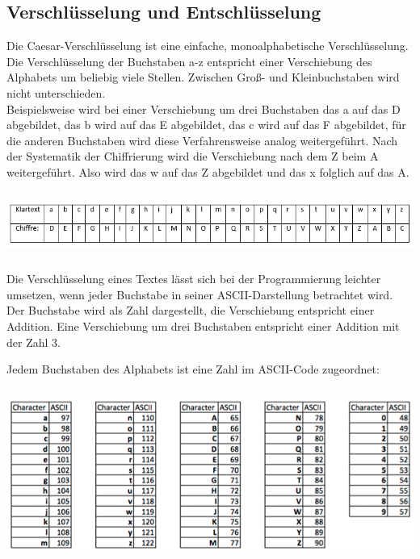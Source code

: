 \documentclass[ngerman,12pt]{article}
\begin{document}
\subsection*{Verschlüsselung und Entschlüsselung}
Die Caesar-Verschlüsselung ist eine einfache, monoalphabetische Verschlüsselung. Die Verschlüsselung der Buchstaben a-z entspricht einer Verschiebung des Alphabets um beliebig viele Stellen. Zwischen Groß- und Kleinbuchstaben wird nicht unterschieden.\\
Beispielsweise wird bei einer Verschiebung um drei Buchstaben das a auf das D abgebildet, das b wird auf das E abgebildet, das c wird auf das F abgebildet, für die anderen Buchstaben wird diese Verfahrensweise analog weitergeführt. Nach der Systematik der Chiffrierung wird die Verschiebung nach dem Z beim A weitergeführt. Also wird das w auf das Z abgebildet und das x folglich auf das A.

\begin{center}
\includegraphics[width=520pt,height=60pt]{Beispiel c=3.png}
\end{center}

Die Verschlüsselung eines Textes lässt sich bei der Programmierung leichter umsetzen, wenn jeder Buchstabe in seiner ASCII-Darstellung betrachtet wird. Der Buchstabe wird als Zahl dargestellt, die Verschiebung entspricht einer Addition. Eine Verschiebung um drei Buchstaben entspricht einer Addition mit der Zahl 3.

\newpage

Jedem Buchstaben des Alphabets ist eine Zahl im ASCII-Code zugeordnet:

\begin{center}
\includegraphics[width=400pt,height=160pt]{ascii.png}
\end{center}
\end{document}
